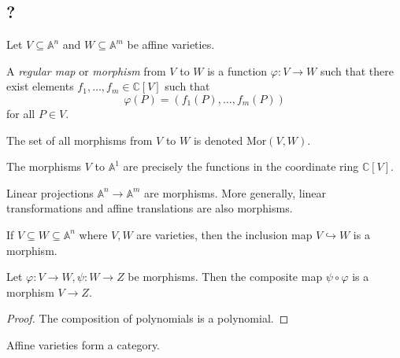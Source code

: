 \subsection{?}
Let \( V \subseteq \mathbb A^n \) and \( W \subseteq \mathbb A^m \) be affine varieties.
\begin{definition}
    A \emph{regular map} or \emph{morphism} from \( V \) to \( W \) is a function \( \varphi \colon V \to W \) such that there exist elements \( f_1, \dots, f_m \in \mathbb C[V] \) such that
    \[ \varphi(P) = (f_1(P), \dots, f_m(P)) \]
    for all \( P \in V \).
\end{definition}
The set of all morphisms from \( V \) to \( W \) is denoted \( \mathrm{Mor}(V,W) \).
\begin{example}
    The morphisms \( V \) to \( \mathbb A^1 \) are precisely the functions in the coordinate ring \( \mathbb C[V] \).
\end{example}
\begin{example}
    Linear projections \( \mathbb A^n \to \mathbb A^m \) are morphisms.
    More generally, linear transformations and affine translations are also morphisms.
\end{example}
\begin{example}
    If \( V \subseteq W \subseteq \mathbb A^n \) where \( V, W \) are varieties, then the inclusion map \( V \hookrightarrow W \) is a morphism.
\end{example}
\begin{proposition}
    Let \( \varphi \colon V \to W, \psi \colon W \to Z \) be morphisms.
    Then the composite map \( \psi \circ \varphi \) is a morphism \( V \to Z \).
\end{proposition}
\begin{proof}
    The composition of polynomials is a polynomial.
\end{proof}
\begin{remark}
    Affine varieties form a category.
\end{remark}

